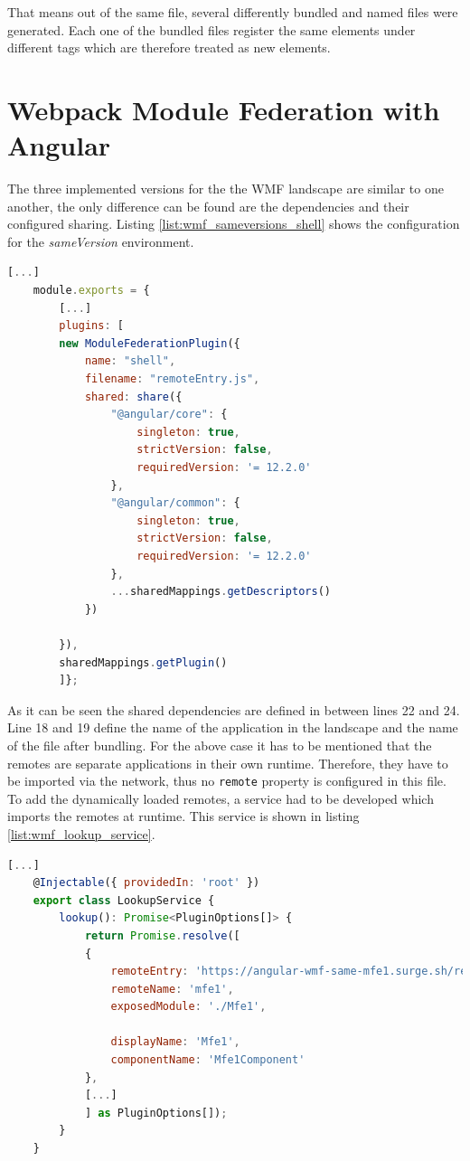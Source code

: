 		That means out of the same file, several differently bundled and named files were generated. Each one of the bundled files register the same elements under different tags which are therefore treated as new elements.

\section{Webpack Module Federation with Angular} 
\label{wmf_implementation_prototype}

The three implemented versions for the the WMF landscape are similar to one another, the only difference can be found are the dependencies and their configured sharing. Listing \ref{list:wmf_sameversions_shell} shows the configuration for the \textit{sameVersion} environment.

\begin{lstlisting}[language=JavaScript, caption=Content of \texttt{webpack.config.js} of the shell of the same versions WMF project, label=list:wmf_sameversions_shell, xleftmargin=.01\textwidth, xrightmargin=.01\textwidth]
	[...]
	module.exports = {
		[...]
		plugins: [
		new ModuleFederationPlugin({
			name: "shell",
			filename: "remoteEntry.js",
			shared: share({
				"@angular/core": { 
					singleton: true, 
					strictVersion: false, 
					requiredVersion: '= 12.2.0'
				},
				"@angular/common": { 
					singleton: true, 
					strictVersion: false, 
					requiredVersion: '= 12.2.0' 
				},
				...sharedMappings.getDescriptors()
			})
			
		}),
		sharedMappings.getPlugin()
		]};
\end{lstlisting}

As it can be seen the shared dependencies are defined in between lines 22 and 24. Line 18 and 19 define the name of the application in the landscape and the name of the file after bundling. For the above case it has to be mentioned that the remotes are separate applications in their own runtime. Therefore, they have to be imported via the network, thus no \texttt{remote} property is configured in this file. To add the dynamically loaded remotes, a service had to be developed which imports the remotes at runtime. This service is shown in listing \ref{list:wmf_lookup_service}.\cite{wmf_angular_dynamicfederation}

\begin{lstlisting}[language=JavaScript, caption=Content of \texttt{lookup.service.ts} for remote module loading in shell applications, label=list:wmf_lookup_service,  xleftmargin=.01\textwidth, xrightmargin=.01\textwidth]
	[...]
	@Injectable({ providedIn: 'root' })
	export class LookupService {
		lookup(): Promise<PluginOptions[]> {
			return Promise.resolve([
			{
				remoteEntry: 'https://angular-wmf-same-mfe1.surge.sh/remoteEntry.js',
				remoteName: 'mfe1',
				exposedModule: './Mfe1',
				
				displayName: 'Mfe1',
				componentName: 'Mfe1Component'
			},
			[...]	
			] as PluginOptions[]);
		}
	}
\end{lstlisting}


